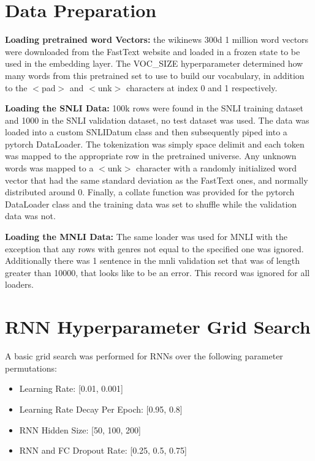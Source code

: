 \documentclass[a4paper,10pt]{article}
\begin{document}
\section{Data Preparation}

\par 
\justify
\textbf{Loading pretrained word Vectors:} the wikinews 300d 1 million word vectors were downloaded from the FastText website \cite{fasttext} and loaded in a frozen state to be used in the embedding layer. The VOC\_SIZE hyperparameter determined how many words from this pretrained set to use to build our vocabulary, in addition to the $<$pad$>$ and $<$unk$>$ characters at index 0 and 1 respectively.

\par 
\justify
\textbf{Loading the SNLI Data:} 100k rows were found in the SNLI training dataset and 1000 in the SNLI validation dataset, no test dataset was used. The data was loaded into a custom SNLIDatum class and then subsequently piped into a pytorch DataLoader. The tokenization was simply space delimit and each token was mapped to the appropriate row in the pretrained universe. Any unknown words was mapped to a $<$unk$>$ character with a randomly initialized word vector that had the same standard deviation as the FastText ones, and normally distributed around 0. Finally, a collate function was provided for the pytorch DataLoader class and the training data was set to shuffle while the validation data was not.

\par 
\justify
\textbf{Loading the MNLI Data:} The same loader was used for MNLI with the exception that any rows with genres not equal to the specified one was ignored. Additionally there was 1 sentence in the mnli validation set that was of length greater than 10000, that looks like to be an error. This record was ignored for all loaders.

\section{RNN Hyperparameter Grid Search}
A basic grid search was performed for RNNs over the following parameter permutations: 
\begin{itemize}
\item Learning Rate: [0.01, 0.001]
\item Learning Rate Decay Per Epoch: [0.95, 0.8]
\item RNN Hidden Size: [50, 100, 200]
\item RNN and FC Dropout Rate: [0.25, 0.5, 0.75]
\end{itemize}
\end{document}
